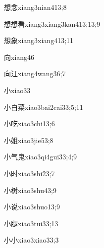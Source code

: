 \begin{verbete}{想念}{xiang3nian4}{13;8}
\end{verbete}
\begin{verbete}{想想看}{xiang3xiang3kan4}{13;13;9}
\end{verbete}
\begin{verbete}{想象}{xiang3xiang4}{13;11}
\end{verbete}
\begin{verbete}{向}{xiang4}{6}
\end{verbete}
\begin{verbete}{向汪}{xiang4wang3}{6;7}
\end{verbete}
\begin{verbete}{小}{xiao3}{3}
\end{verbete}
\begin{verbete}{小白菜}{xiao3bai2cai3}{3;5;11}
\end{verbete}
\begin{verbete}{小吃}{xiao3chi1}{3;6}
\end{verbete}
\begin{verbete}{小姐}{xiao3jie5}{3;8}
\end{verbete}
\begin{verbete}{小气鬼}{xiao3qi4gui3}{3;4;9}
\end{verbete}
\begin{verbete}{小时}{xiao3shi2}{3;7}
\end{verbete}
\begin{verbete}{小树}{xiao3shu4}{3;9}
\end{verbete}
\begin{verbete}{小说}{xiao3shuo1}{3;9}
\end{verbete}
\begin{verbete}{小腿}{xiao3tui3}{3;13}
\end{verbete}
\begin{verbete}{小小}{xiao3xiao3}{3;3}
\end{verbete}
